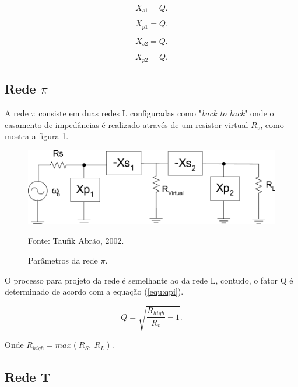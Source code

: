 \begin{equation}
X_{s1} = Q.
\label{equ:xs1}
\end{equation}

\begin{equation}
X_{p1} = Q.
\label{equ:xp1}
\end{equation}

\begin{equation}
X_{s2} = Q.
\label{equ:xs2}
\end{equation}

\begin{equation}
X_{p2} = Q.
\label{equ:xp2}
\end{equation}

\subsection{Rede $\pi$}\label{subsec:pi}

A rede $\pi$ consiste em duas redes L configuradas como "\textit{back to back}" \cite{abrao} onde o casamento de impedâncias é realizado através de um resistor virtual $R_v$, como mostra a figura \ref{fig:pi}.

\begin{figure}[H]
    \centering
    \caption{Parâmetros da rede $\pi$.}
    \includegraphics[scale=0.8]{Imagens/pi.pdf}
    \label{fig:pi}
    
    \small Fonte: Taufik Abrão, 2002.
\end{figure}

O processo para projeto da rede é semelhante ao da rede L, contudo, o fator Q é determinado de acordo com a equação (\ref{equ:qpi}).

\begin{equation}
Q = \sqrt{\frac{R_{high}}{R_{v}} -1 }.
\label{equ:qpi}
\end{equation}

Onde $R_{high} = max(R_S, \ R_L)$.

\subsection{Rede T}\label{subsec:t}

